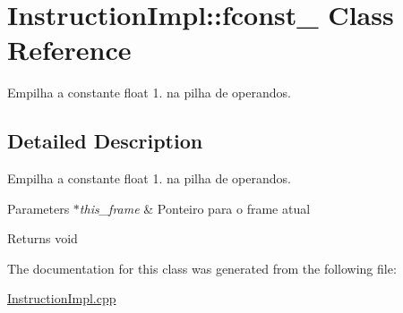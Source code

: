 \hypertarget{class_instruction_impl_1_1fconst__1}{}\section{Instruction\+Impl\+:\+:fconst\+\_ Class Reference}
\label{class_instruction_impl_1_1fconst__1}


Empilha a constante float 1. na pilha de operandos.  




\subsection{Detailed Description}
Empilha a constante float 1. na pilha de operandos. 


\begin{DoxyParams}{Parameters}
{\em $\ast$this\+\_\+frame} & Ponteiro para o frame atual \\
\hline
\end{DoxyParams}
\begin{DoxyReturn}{Returns}
void 
\end{DoxyReturn}


The documentation for this class was generated from the following file\+:\begin{DoxyCompactItemize}
\item 
\hyperlink{_instruction_impl_8cpp}{Instruction\+Impl.\+cpp}\end{DoxyCompactItemize}
